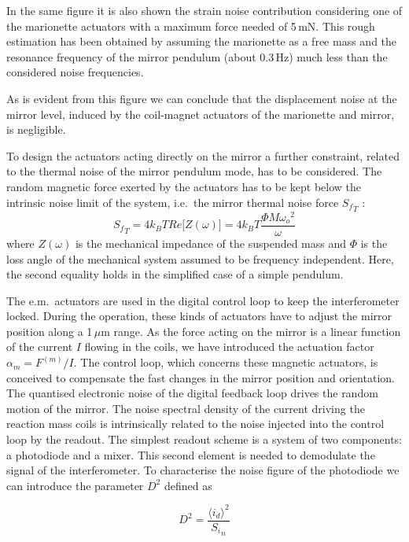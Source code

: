 In the same figure it is also shown the strain noise contribution considering one of the marionette actuators with a maximum force needed of 5\,mN. This rough estimation has been obtained by assuming the marionette as a free mass and the resonance frequency of the mirror pendulum (about 0.3\,Hz) much less than the considered noise frequencies.

As is evident from this figure we can conclude that the displacement noise at the mirror level, induced by the coil-magnet actuators of the marionette and mirror, is negligible.

To design the actuators acting directly on the mirror a further constraint, related to the thermal noise of the mirror pendulum mode, has to be considered. 
The random magnetic force exerted by the actuators has to be kept below the intrinsic noise limit of the system, i.e.\ the mirror thermal noise force
 ${S_f}_T $ :
\begin{equation}
{S_f}_T = 4 k_B T Re\Big[ Z (\omega) \Big] = 4 k_B  T \frac{ \Phi M {\omega_o}^2}{\omega} 
\label{eq:thermal_noise_force}
\end{equation}
where $Z ( \omega )$ is the mechanical impedance of the suspended mass and $\Phi$ is the loss angle of the mechanical system assumed to be frequency independent. Here, the second equality holds in the simplified case of a simple pendulum. 

The e.m.\ actuators are used in the digital control loop to keep the interferometer locked.  During the operation, these kinds of actuators have to adjust the mirror position along a 1\,$\mu$m range.
As the force acting on the mirror is a linear function of the current $I$ flowing in the coils, we have introduced the actuation factor $\alpha_m = F^{(m)} / I$.	The	control loop, which concerns these magnetic actuators, is conceived to compensate the fast changes in the mirror position and orientation. The quantised electronic noise of the digital feedback loop drives the random motion of the mirror. The noise spectral density of the current driving the reaction mass coils is intrinsically related to the noise injected into the control loop by the readout. The simplest readout scheme is a system of two components: a photodiode and a mixer. This second element is needed to demodulate the signal of the interferometer. To characterise the noise figure of the photodiode we can introduce the  parameter $D^2$  defined as 

\begin{equation}
 D^2= \frac {\langle i_d \rangle ^2} {{S_i}_n} 
 \label{eq:D}
 \end{equation}
 
